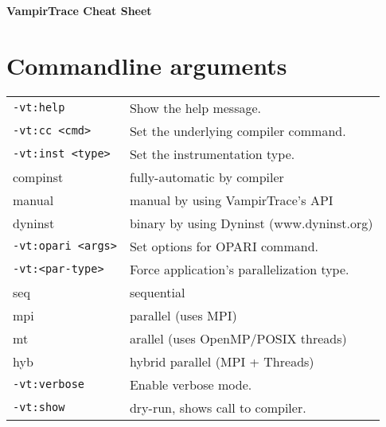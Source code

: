 \raggedright
\footnotesize
\begin{multicols}{3}


\setlength{\premulticols}{1pt}
\setlength{\postmulticols}{1pt}
\setlength{\multicolsep}{1pt}
\setlength{\columnsep}{2pt}

\begin{center}
     \Large{\textbf{VampirTrace Cheat Sheet}} \\
\end{center}

\section{Commandline arguments}
\begin{tabular}{@{}ll@{}}
\texttt{-vt:help}            & Show the help message.\\
\texttt{-vt:cc  <cmd>}       & Set the underlying compiler command.\\
\texttt{-vt:inst <type>}     & Set the instrumentation type.\\
\hspace{5ex} compinst          & fully-automatic by compiler\\
\hspace{5ex} manual            & manual by using VampirTrace's API\\
\hspace{5ex} dyninst           & binary by using Dyninst (www.dyninst.org) \\
\texttt{-vt:opari <args>}    & Set options for OPARI command.\\
\texttt{-vt:<par-type>}      & Force application's parallelization type.\\
\hspace{5ex} seq               & sequential\\
\hspace{5ex} mpi               & parallel (uses MPI)\\
\hspace{5ex} mt                & arallel (uses OpenMP/POSIX threads)\\
\hspace{5ex} hyb               & hybrid parallel (MPI + Threads)\\
\texttt{-vt:verbose}         & Enable verbose mode.\\
\texttt{-vt:show}            & dry-run, shows call to compiler.
\end{tabular}


\end{multicols}
